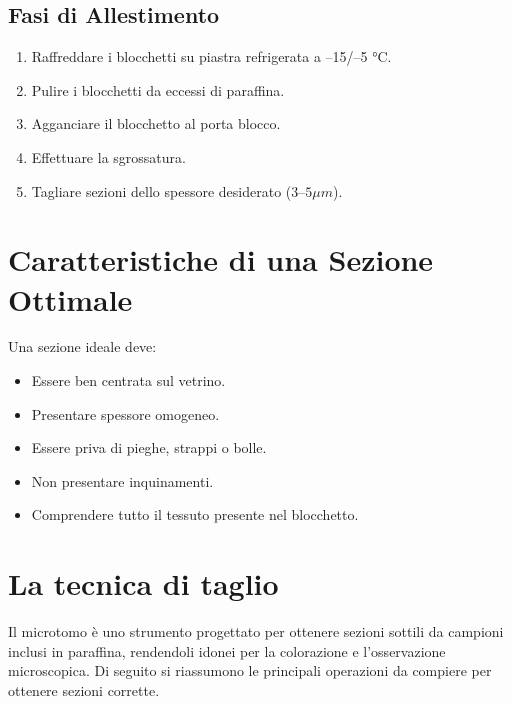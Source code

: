 \subsection{Fasi di Allestimento}

\begin{enumerate}
    \item Raffreddare i blocchetti su piastra refrigerata a –15/–5 °C.
    \item Pulire i blocchetti da eccessi di paraffina.
    \item Agganciare il blocchetto al porta blocco.
    \item Effettuare la sgrossatura.
    \item Tagliare sezioni dello spessore desiderato ($3–5\mu m$).
\end{enumerate}


\section{Caratteristiche di una Sezione Ottimale}

Una sezione ideale deve:

\begin{itemize}
    \item Essere ben centrata sul vetrino.
    \item Presentare spessore omogeneo.
    \item Essere priva di pieghe, strappi o bolle.
    \item Non presentare inquinamenti.
    \item Comprendere tutto il tessuto presente nel blocchetto.
\end{itemize}

\section{La tecnica di taglio}

Il microtomo è uno strumento progettato per ottenere sezioni sottili da campioni inclusi in paraffina, rendendoli idonei per la colorazione e l'osservazione microscopica. Di seguito si riassumono le principali operazioni da compiere per ottenere sezioni corrette.

